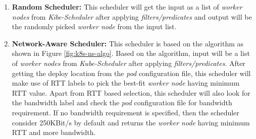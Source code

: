 \begin{enumerate}
  \item \textbf{Random Scheduler:} This scheduler will get the input as a list of \emph{worker nodes} from \emph{Kibe-Scheduler} after applying \emph{filters/predicates} and output will be the randomly picked \emph{worker node} from the input list\cite{Santos2019}.
  \item \textbf{Network-Aware Scheduler:} This scheduler is based on the algorithm as shown in Figure \ref{fig:k8s-ns-algo}. Based on the algorithm, input will be a list of \emph{worker nodes} from \emph{Kube-Scheduler} after applying \emph{filters/predicates}. After getting the deploy location from the \emph{pod} configuration file, this scheduler will make use of RTT labels to pick the best-fit \emph{worker node} having minimum RTT value\cite{Santos2019}. Apart from RTT based selection, this scheduler will also look for the bandwidth label and check the \emph{pod} configuration file for bandwidth requirement\cite{Santos2019}. If no bandwidth requirement is specified, then the scheduler consider 250KBit/s by default and returns the \emph{worker node} having minimum RTT and more bandwidth\cite{Santos2019}.
\end{enumerate}
\vspace{-0.6cm}
